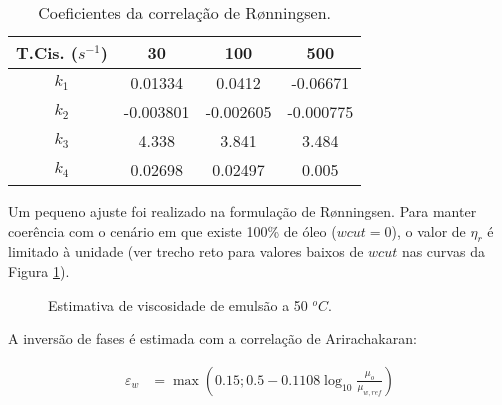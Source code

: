 \documentclass[final,5p]{elsarticle}
\numberwithin{equation}{section}
\begin{document}
        \begin{table}[ht]
            \centering
            \begin{tabular}{c|ccc}
                T.Cis. ($s^{-1}$) & 30 & 100 & 500 \\
                 \hline
                 $k_1$ & 0.01334 & 0.0412 & -0.06671 \\
                 $k_2$ & -0.003801 & -0.002605 & -0.000775 \\
                 $k_3$ & 4.338 & 3.841 & 3.484 \\
                 $k_4$ & 0.02698 & 0.02497 & 0.005 \\
            \end{tabular}
            \caption{Coeficientes da correlação de Rønningsen.}
            \label{tab:ronningsen}
        \end{table}

        Um pequeno ajuste foi realizado na formulação de Rønningsen. Para manter coerência com o cenário em que existe 100\% de óleo ($wcut=0$), o valor de $\eta_r$ é limitado à unidade (ver trecho reto para valores baixos de $wcut$ nas curvas da Figura \ref{fig:emulsao}).

        \begin{figure}[hbt!]
            \caption{Estimativa de viscosidade de emulsão a 50 $^oC$.}
            \label{fig:emulsao}
        \end{figure}

        A inversão de fases é estimada com a correlação de Arirachakaran\cite{10.2118/18836-MS}:

        \begin{align}
            \varepsilon_w &= \max \left(0.15; 0.5 - 0.1108 \log_{10} \frac{\mu_o}{\mu_{w,ref}}\right)
        \end{align}
\end{document}
